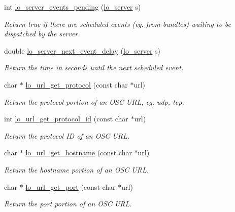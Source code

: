 \begin{DoxyCompactItemize}
int \hyperlink{group__liblolowlevel_ga04feb1063c3f4df6fec41405b28dd99a}{lo\+\_\+server\+\_\+events\+\_\+pending} (\hyperlink{lo__types_8h_a59067bf50cf8abb4371da6f03c9036c9}{lo\+\_\+server} s)
\begin{DoxyCompactList}\small\item\em Return true if there are scheduled events (eg. from bundles) waiting to be dispatched by the server. \end{DoxyCompactList}\item 
double \hyperlink{group__liblolowlevel_ga750076fdd75e2a7d3e442f6bd5968fb9}{lo\+\_\+server\+\_\+next\+\_\+event\+\_\+delay} (\hyperlink{lo__types_8h_a59067bf50cf8abb4371da6f03c9036c9}{lo\+\_\+server} s)
\begin{DoxyCompactList}\small\item\em Return the time in seconds until the next scheduled event. \end{DoxyCompactList}\item 
char $\ast$ \hyperlink{group__liblolowlevel_ga58266d3085b73fc4dc5e1913de810b22}{lo\+\_\+url\+\_\+get\+\_\+protocol} (const char $\ast$url)
\begin{DoxyCompactList}\small\item\em Return the protocol portion of an O\+S\+C U\+R\+L, eg. udp, tcp. \end{DoxyCompactList}\item 
int \hyperlink{group__liblolowlevel_ga0550cc91417b530c26a360b10072a3cb}{lo\+\_\+url\+\_\+get\+\_\+protocol\+\_\+id} (const char $\ast$url)
\begin{DoxyCompactList}\small\item\em Return the protocol I\+D of an O\+S\+C U\+R\+L. \end{DoxyCompactList}\item 
char $\ast$ \hyperlink{group__liblolowlevel_gab1b7df7061a0b2cd0db31d3fca1b399b}{lo\+\_\+url\+\_\+get\+\_\+hostname} (const char $\ast$url)
\begin{DoxyCompactList}\small\item\em Return the hostname portion of an O\+S\+C U\+R\+L. \end{DoxyCompactList}\item 
char $\ast$ \hyperlink{group__liblolowlevel_ga488fb8e96fb86320590c1a8ca389593d}{lo\+\_\+url\+\_\+get\+\_\+port} (const char $\ast$url)
\begin{DoxyCompactList}\small\item\em Return the port portion of an O\+S\+C U\+R\+L. \end{DoxyCompactList}\item 

\end{DoxyCompactItemize}
